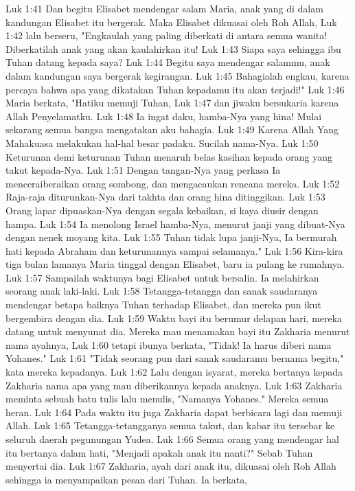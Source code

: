 Luk 1:41  Dan begitu Elisabet mendengar salam Maria, anak yang di dalam kandungan Elisabet itu bergerak. Maka Elisabet dikuasai oleh Roh Allah,
Luk 1:42  lalu berseru, "Engkaulah yang paling diberkati di antara semua wanita! Diberkatilah anak yang akan kaulahirkan itu!
Luk 1:43  Siapa saya sehingga ibu Tuhan datang kepada saya?
Luk 1:44  Begitu saya mendengar salammu, anak dalam kandungan saya bergerak kegirangan.
Luk 1:45  Bahagialah engkau, karena percaya bahwa apa yang dikatakan Tuhan kepadamu itu akan terjadi!"
Luk 1:46  Maria berkata, "Hatiku memuji Tuhan,
Luk 1:47  dan jiwaku bersukaria karena Allah Penyelamatku.
Luk 1:48  Ia ingat daku, hamba-Nya yang hina! Mulai sekarang semua bangsa mengatakan aku bahagia.
Luk 1:49  Karena Allah Yang Mahakuasa melakukan hal-hal besar padaku. Sucilah nama-Nya.
Luk 1:50  Keturunan demi keturunan Tuhan menaruh belas kasihan kepada orang yang takut kepada-Nya.
Luk 1:51  Dengan tangan-Nya yang perkasa Ia menceraiberaikan orang sombong, dan mengacaukan rencana mereka.
Luk 1:52  Raja-raja diturunkan-Nya dari takhta dan orang hina ditinggikan.
Luk 1:53  Orang lapar dipuaskan-Nya dengan segala kebaikan, si kaya diusir dengan hampa.
Luk 1:54  Ia menolong Israel hamba-Nya, menurut janji yang dibuat-Nya dengan nenek moyang kita.
Luk 1:55  Tuhan tidak lupa janji-Nya, Ia bermurah hati kepada Abraham dan keturunannya sampai selamanya."
Luk 1:56  Kira-kira tiga bulan lamanya Maria tinggal dengan Elisabet, baru ia pulang ke rumahnya.
Luk 1:57  Sampailah waktunya bagi Elisabet untuk bersalin. Ia melahirkan seorang anak laki-laki.
Luk 1:58  Tetangga-tetangga dan sanak saudaranya mendengar betapa baiknya Tuhan terhadap Elisabet, dan mereka pun ikut bergembira dengan dia.
Luk 1:59  Waktu bayi itu berumur delapan hari, mereka datang untuk menyunat dia. Mereka mau menamakan bayi itu Zakharia menurut nama ayahnya,
Luk 1:60  tetapi ibunya berkata, "Tidak! Ia harus diberi nama Yohanes."
Luk 1:61  "Tidak seorang pun dari sanak saudaramu bernama begitu," kata mereka kepadanya.
Luk 1:62  Lalu dengan isyarat, mereka bertanya kepada Zakharia nama apa yang mau diberikannya kepada anaknya.
Luk 1:63  Zakharia meminta sebuah batu tulis lalu menulis, "Namanya Yohanes." Mereka semua heran.
Luk 1:64  Pada waktu itu juga Zakharia dapat berbicara lagi dan memuji Allah.
Luk 1:65  Tetangga-tetangganya semua takut, dan kabar itu tersebar ke seluruh daerah pegunungan Yudea.
Luk 1:66  Semua orang yang mendengar hal itu bertanya dalam hati, "Menjadi apakah anak itu nanti?" Sebab Tuhan menyertai dia.
Luk 1:67  Zakharia, ayah dari anak itu, dikuasai oleh Roh Allah sehingga ia menyampaikan pesan dari Tuhan. Ia berkata,
